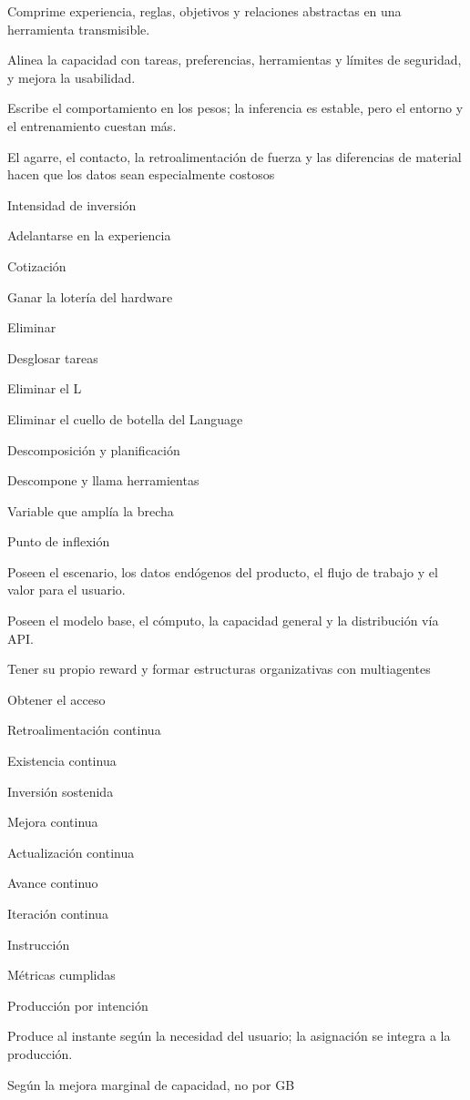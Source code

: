 \documentclass{article}
\begin{document}
Comprime experiencia, reglas, objetivos y relaciones abstractas en una herramienta transmisible.

Alinea la capacidad con tareas, preferencias, herramientas y límites de seguridad, y mejora la usabilidad.

Escribe el comportamiento en los pesos; la inferencia es estable, pero el entorno y el entrenamiento cuestan más.

El agarre, el contacto, la retroalimentación de fuerza y las diferencias de material hacen que los datos sean especialmente costosos

Intensidad de inversión

Adelantarse en la experiencia

Cotización

Ganar la lotería del hardware

Eliminar

Desglosar tareas

Eliminar el L

Eliminar el cuello de botella del Language

Descomposición y planificación

Descompone y llama herramientas

Variable que amplía la brecha

Punto de inflexión

Poseen el escenario, los datos endógenos del producto, el flujo de trabajo y el valor para el usuario.

Poseen el modelo base, el cómputo, la capacidad general y la distribución vía API.

Tener su propio reward y formar estructuras organizativas con multiagentes

Obtener el acceso

Retroalimentación continua

Existencia continua

Inversión sostenida

Mejora continua

Actualización continua

Avance continuo

Iteración continua

Instrucción

Métricas cumplidas

Producción por intención

Produce al instante según la necesidad del usuario; la asignación se integra a la producción.

Según la mejora marginal de capacidad, no por GB
\end{document}
